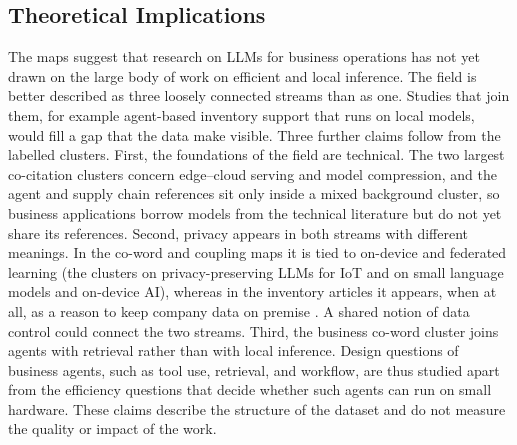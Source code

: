 \subsection{Theoretical Implications}
The maps suggest that research on LLMs for business operations has not yet drawn on the large body of work on efficient and local inference. The field is better described as three loosely connected streams than as one. Studies that join them, for example agent-based inventory support that runs on local models, would fill a gap that the data make visible. Three further claims follow from the labelled clusters. First, the foundations of the field are technical. The two largest co-citation clusters concern edge--cloud serving and model compression, and the agent and supply chain references sit only inside a mixed background cluster, so business applications borrow models from the technical literature but do not yet share its references. Second, privacy appears in both streams with different meanings. In the co-word and coupling maps it is tied to on-device and federated learning (the clusters on privacy-preserving LLMs for IoT and on small language models and on-device AI), whereas in the inventory articles it appears, when at all, as a reason to keep company data on premise \parencite{wong2026}. A shared notion of data control could connect the two streams. Third, the business co-word cluster joins agents with retrieval rather than with local inference. Design questions of business agents, such as tool use, retrieval, and workflow, are thus studied apart from the efficiency questions that decide whether such agents can run on small hardware. These claims describe the structure of the dataset and do not measure the quality or impact of the work.

